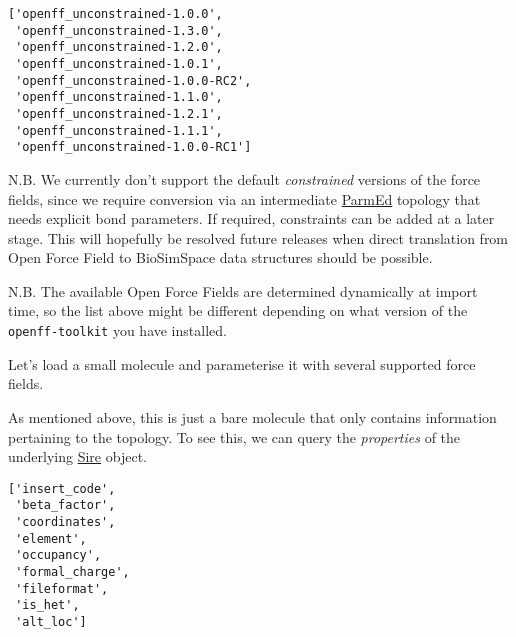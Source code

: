 \begin{verbatim}
['openff_unconstrained-1.0.0',
 'openff_unconstrained-1.3.0',
 'openff_unconstrained-1.2.0',
 'openff_unconstrained-1.0.1',
 'openff_unconstrained-1.0.0-RC2',
 'openff_unconstrained-1.1.0',
 'openff_unconstrained-1.2.1',
 'openff_unconstrained-1.1.1',
 'openff_unconstrained-1.0.0-RC1']
\end{verbatim}

N.B. We currently don't support the default \emph{constrained} versions
of the force fields, since we require conversion via an intermediate
\href{https://github.com/ParmEd/ParmEd}{ParmEd} topology that needs
explicit bond parameters. If required, constraints can be added at a
later stage. This will hopefully be resolved future releases when direct
translation from Open Force Field to BioSimSpace data structures should
be possible.

N.B. The available Open Force Fields are determined dynamically at
import time, so the list above might be different depending on what
version of the \texttt{openff-toolkit} you have installed.

Let's load a small molecule and parameterise it with several supported
force fields.

\begin{Shaded}
\begin{Highlighting}[]
\OperatorTok{=}\NormalTok{)[}\NormalTok{]}
\end{Highlighting}
\end{Shaded}

As mentioned above, this is just a bare molecule that only contains
information pertaining to the topology. To see this, we can query the
\emph{properties} of the underlying
\href{https://github.com/michellab/Sire}{Sire} object.

\begin{Shaded}
\begin{Highlighting}[]
\end{Highlighting}
\end{Shaded}

\begin{verbatim}
['insert_code',
 'beta_factor',
 'coordinates',
 'element',
 'occupancy',
 'formal_charge',
 'fileformat',
 'is_het',
 'alt_loc']
\end{verbatim}

